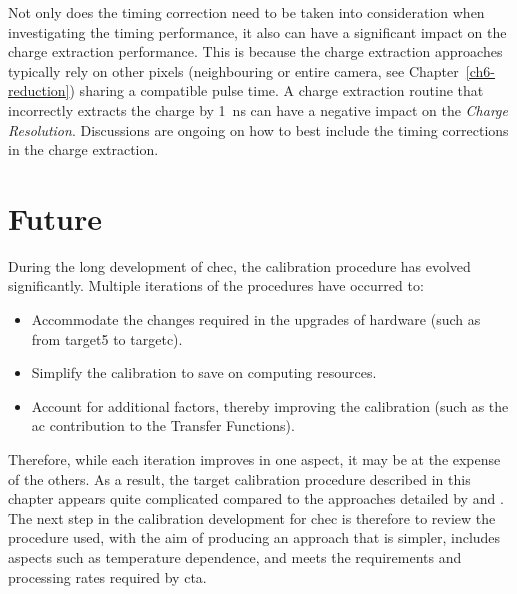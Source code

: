 Not only does the timing correction need to be taken into consideration when investigating the timing performance, it also can have a significant impact on the charge extraction performance. This is because the charge extraction approaches typically rely on other pixels (neighbouring or entire camera, see Chapter~\ref{ch6-reduction}) sharing a compatible pulse time. A charge extraction routine that incorrectly extracts the charge by \SI{1}{ns} can have a negative impact on the \textit{Charge Resolution}. Discussions are ongoing on how to best include the timing corrections in the charge extraction.

\section{Future}

During the long development of \gls{chec}, the calibration procedure has evolved significantly. Multiple iterations of the procedures have occurred to:
\begin{itemize}
	\item Accommodate the changes required in the upgrades of hardware (such as from \gls{target5} to \gls{targetc}).
	\item Simplify the calibration to save on computing resources.
	\item Account for additional factors, thereby improving the calibration (such as the \gls{ac} contribution to the Transfer Functions).
\end{itemize}
Therefore, while each iteration improves in one aspect, it may be at the expense of the others. As a result, the \gls{target} calibration procedure described in this chapter appears quite complicated compared to the approaches detailed by \textcite{Bechtol2012} and \textcite{Albert2017}. The next step in the calibration development for \gls{chec} is therefore to review the procedure used, with the aim of producing an approach that is simpler, includes aspects such as temperature dependence, and meets the requirements and processing rates required by \gls{cta}.
